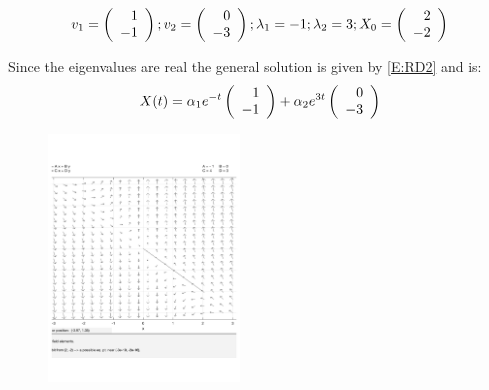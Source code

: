 \documentclass{ximera}
\begin{document}
\begin{exercise} \label{A6.4.2}
\[
v_1 = \left(\begin{array}{rrrrrrrrrrrrrrrrrr}  1 \\ -1 \end{array}\right); v_2 = \left(\begin{array}{rrrrrrrrrrrrrrrrrr}  0 \\ -3  \end{array}\right); \lambda_1 = -1; \lambda_2 = 3; X_0 = \left(\begin{array}{rrrrrrrrrrrrrrrrrr} 2 \\ -2  \end{array}\right)
\]

\begin{solution}
\soln Since the eigenvalues are real the general solution is given by \eqref{E:RD2} and is:
\[
X(t) = \alpha_1 e^{-t} \left(\begin{array}{rrrrrrrrrrrrrrrrrr}  1 \\ -1 \end{array}\right) + \alpha_2 e^{3t}\left(\begin{array}{rrrrrrrrrrrrrrrrrr}  0 \\ -3  \end{array}\right)
\]

\begin{figure}[htb]
           \centerline{%
           \includegraphics[width=2.0in]{exfigure/A6_4_2a.pdf}}
\end{figure}
\end{solution}
\end{exercise}
\end{document}
